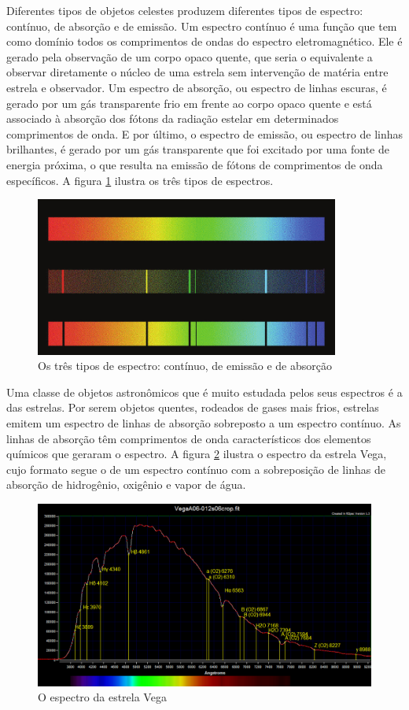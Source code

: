 Diferentes tipos de objetos celestes produzem diferentes tipos de espectro:  contínuo, de absorção e de emissão. Um espectro contínuo é uma função que tem como domínio todos os comprimentos de ondas do espectro eletromagnético.
Ele é gerado pela observação de um corpo opaco quente, que seria o equivalente a observar diretamente o núcleo de uma estrela sem intervenção de matéria entre estrela e observador. Um espectro de absorção, ou espectro de linhas escuras, é gerado por um gás transparente frio em frente ao corpo opaco quente e está associado à absorção dos fótons da radiação estelar em determinados comprimentos de onda. E por último, o espectro de emissão, ou espectro de linhas brilhantes, é gerado por um gás transparente que foi excitado por uma fonte de energia próxima, o que resulta na emissão de fótons de comprimentos de onda específicos. A figura \ref{fig:spectrum-types} ilustra os três tipos de espectros. 

\begin{figure}[htb]
\centering
\includegraphics[width=10cm]{figuras/Continuous-spectrum-and-two-types-of-line-spectra.png}
\caption{Os três tipos de espectro: contínuo, de emissão e de absorção \citep{mcgrawhill}}
\label{fig:spectrum-types}
\end{figure}

Uma classe de objetos astronômicos que é muito estudada pelos seus espectros é a das estrelas. Por serem objetos quentes, rodeados de gases mais frios, estrelas emitem um espectro de linhas de absorção sobreposto a um espectro contínuo. As linhas de absorção têm comprimentos de onda característicos dos elementos químicos que geraram o espectro. A figura \ref{fig:vega-spectrum} ilustra o espectro da estrela Vega, cujo formato segue o de um espectro contínuo com a sobreposição de linhas de absorção de hidrogênio, oxigênio e vapor de água.

\begin{figure}[htb]
\centering
\includegraphics[width=12cm]{figuras/vega_spectrum.jpg}
\caption{O espectro da estrela Vega\citep{vega-spectrum}}
\label{fig:vega-spectrum}
\end{figure}

